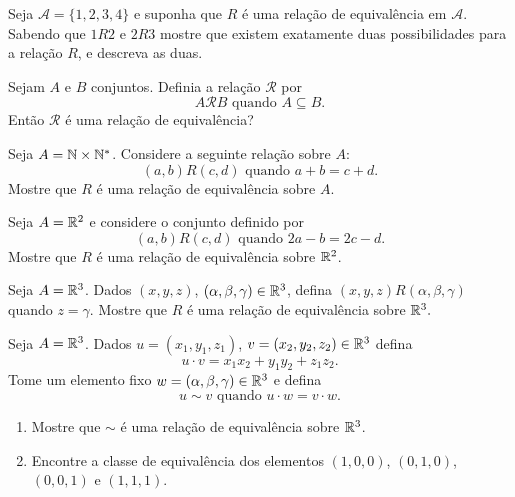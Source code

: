 \documentclass[12pt]{exam}
\begin{document}
    \vspace{.3cm}

    \questao{} Seja $\mathcal{A} = \{1,2,3,4\}$ e suponha que $R$ \'e uma rela\c{c}\~ao de equival\^encia em $\mathcal{A}$. Sabendo que $1R2$ e $2R3$ mostre que existem exatamente duas possibilidades para a rela\c{c}\~ao $R$, e descreva as duas.

    \vspace{.3cm}

    \questao{} Sejam $A$ e $B$ conjuntos. Definia a rela{\c c}\~ao $\mathcal{R}$ por
    \[
        A \mathcal{R} B \mbox{ quando } A \subseteq B.
    \]
    Ent\~ao $\mathcal{R}$ \'e uma rela{\c c}\~ao de equival\^encia?

    \vspace{.3cm}

    \questao{} Seja $A = \mathbb{N} \times \mathbb{N}^*$. Considere a seguinte
    rela{\c c}{\~a}o sobre $A$:
    \[
        (a,b) R (c,d) \mbox{ quando } a + b = c + d.
    \]
    Mostre que $R$ {\'e} uma rela{\c c}{\~a}o de equival{\^e}ncia sobre $A$.

    \vspace{.3cm}

    \questao{} Seja $A = \mathbb{R}^2$ e considere o conjunto definido por
    \[
      (a,b)R(c,d) \mbox{ quando } 2a - b = 2c - d.
    \]
    Mostre que $R$ \'e uma rela\c{c}\~ao de equival\^encia sobre $\mathbb{R}^2$.

    \vspace{.3cm}

    \questao{} Seja $A = \mathbb{R}^3$. Dados $(x, y, z)$, $(\alpha, \beta, \gamma) \in \mathbb{R}^3$, defina $(x, y, z) R (\alpha, \beta, \gamma)$ quando $z = \gamma$. Mostre que $R$ \'e uma rela\c{c}\~ao de equival\^encia sobre $\mathbb{R}^3.$

    \vspace{.3cm}

    \questao{} Seja $A = \mathbb{R}^3$. Dados $u = (x_1, y_1, z_1)$, $v = (x_2, y_2, z_2) \in \mathbb{R}^3$ defina
    \[
        u\cdot v = x_1x_2 + y_1y_2 + z_1z_2.
    \]
    Tome um elemento fixo $w = (\alpha, \beta, \gamma) \in \mathbb{R}^3$ e defina
    \[
        u \sim v \mbox{ quando } u \cdot w = v \cdot w.
    \]

    \begin{enumerate}[label={\alph*})]
        \item Mostre que $\sim$ \'e uma rela\c{c}\~ao de equival\^encia sobre $\mathbb{R}^3$.

        \item Encontre a classe de equivalência dos elementos $(1, 0, 0)$, $(0, 1, 0)$, $(0, 0, 1)$ e $(1, 1, 1)$.
    \end{enumerate}
    \vspace{.3cm}
\end{document}
